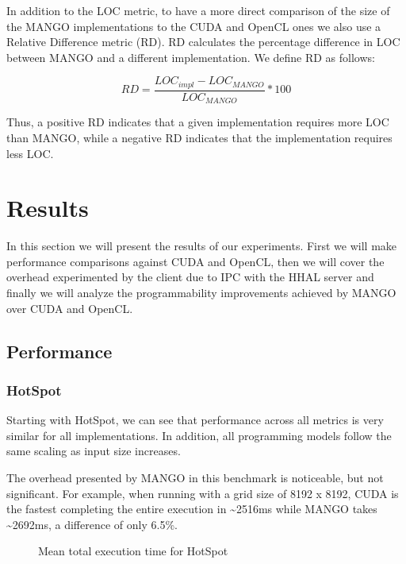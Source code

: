 In addition to the LOC metric, to have a more direct comparison of the size of the MANGO implementations to the CUDA and OpenCL ones we also use a Relative Difference metric (RD). RD calculates the percentage difference in LOC between MANGO and a different implementation. We define RD as follows:

\[
    RD = \frac{LOC_{impl} - LOC_{MANGO}}{LOC_{MANGO}} * 100
\]

Thus, a positive RD indicates that a given implementation requires more LOC than MANGO, while a negative RD indicates that the implementation requires less LOC.

\section{Results}

In this section we will present the results of our experiments. First we will make performance comparisons against CUDA and OpenCL, then we will cover the overhead experimented by the client due to IPC with the HHAL server and finally we will analyze the programmability improvements achieved by MANGO over CUDA and OpenCL.

\subsection{Performance}

\subsubsection{HotSpot}

Starting with HotSpot, we can see that performance across all metrics is very similar for all implementations. In addition, all programming models follow the same scaling as input size increases. 

The overhead presented by MANGO in this benchmark is noticeable, but not significant. For example, when running with a grid size of 8192 x 8192, CUDA is the fastest completing the entire execution in \textasciitilde 2516ms while MANGO takes \textasciitilde 2692ms, a difference of only 6.5\%. 

\begin{figure}
    \centering
    \resizebox{!}{180pt}{
        
    }
    \captionsetup{justification=centering}
    \caption{Mean total execution time for HotSpot}
    \label{fig:hotspot_total_duration_mean}
\end{figure}

